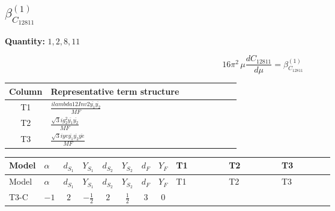 \documentclass[8pt]{article}
\begin{document}
\begin{landscape}
\section*{$\beta_{C_{12811}}^{(1)}$}
\noindent\textbf{Quantity: }$\mathrm{1,2,8,11}$\par\smallskip
\[16\pi^2\,\mu\frac{d C_{12811}}{d\mu}=\beta_{C_{12811}}^{(1)}\]
\begin{center}
\begin{tabular}{@{}c >{\raggedright\arraybackslash}p{0.82\linewidth}@{}}
\toprule
Column & Representative term structure \\
\midrule
T1 & \(\displaystyle \frac{i lambda12Inv2 \overline{y_{1}} \overline{y_{2}}}{MF}\) \\
\midrule
T2 & \(\displaystyle \frac{\sqrt{3} i g_{2}^{2} \overline{y_{1}} \overline{y_{2}}}{MF}\) \\
\midrule
T3 & \(\displaystyle \frac{\sqrt{3} i ye \overline{y_{1}} \overline{y_{2}} \overline{ye}}{MF}\) \\
\midrule
\bottomrule
\end{tabular}
\end{center}
\smallskip
\tiny
\begin{longtable}{@{}llcccccc >{\raggedright\arraybackslash}p{0.21\linewidth} >{\raggedright\arraybackslash}p{0.21\linewidth} >{\raggedright\arraybackslash}p{0.21\linewidth}@{}}
\toprule
Model & $\alpha$ & $d_{S_1}$ & $Y_{S_1}$ & $d_{S_2}$ & $Y_{S_2}$ & $d_F$ & $Y_F$ & T1 & T2 & T3 \\
\midrule
\endfirsthead
\toprule
Model & $\alpha$ & $d_{S_1}$ & $Y_{S_1}$ & $d_{S_2}$ & $Y_{S_2}$ & $d_F$ & $Y_F$ & T1 & T2 & T3 \\
\midrule
\endhead
T3-C & $-1$ & $2$ & $-\frac{1}{2}$ & $2$ & $\frac{1}{2}$ & $3$ & $0$ & \scriptsize\adjustbox{max width=\linewidth}{$\begin{gathered} - \frac{i lambda12Inv2 \overline{y_{1}} \overline{y_{2}}}{6 MF}\end{gathered}$} & \scriptsize\adjustbox{max width=\linewidth}{$\begin{gathered} - \frac{\sqrt{3} i g_{2}^{2} \overline{y_{1}} \overline{y_{2}}}{8 MF}\end{gathered}$} & \scriptsize\adjustbox{max width=\linewidth}{$\begin{gathered} \frac{\sqrt{3} i ye \overline{y_{1}} \overline{y_{2}} \overline{ye}}{24 MF}\end{gathered}$} \\
\midrule
\bottomrule
\end{longtable}
\clearpage

\end{landscape}
\end{document}
